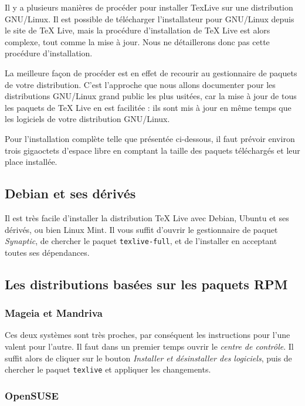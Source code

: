 Il y a plusieurs manières de procéder pour installer TexLive sur une distribution GNU/Linux. Il est possible de télécharger l'installateur pour GNU/Linux depuis le site de TeX Live, mais la procédure d'installation de TeX Live est alors complexe, tout comme la mise à jour. Nous ne détaillerons donc pas cette procédure d'installation.

La meilleure façon de procéder est en effet de recourir au gestionnaire de paquets de votre distribution. C'est l'approche que nous allons documenter pour les distributions GNU/Linux grand public les plus usitées, car la mise à jour de tous les paquets de TeX Live en est facilitée : ils sont mis à jour en même temps que les logiciels de votre distribution GNU/Linux.

Pour l'installation complète telle que présentée ci-dessous, il faut prévoir environ trois gigaoctets d'espace libre en comptant la taille des paquets téléchargés et leur place installée.

\subsection{Debian et ses dérivés}

Il est très facile d'installer la distribution TeX Live avec Debian, Ubuntu et ses dérivés, ou bien Linux Mint. Il vous suffit d'ouvrir le gestionnaire de paquet \emph{Synaptic}, de chercher le paquet  \verb|texlive-full|, et de l'installer en acceptant toutes ses dépendances.

\subsection{Les distributions basées sur les paquets RPM}

\subsubsection{Mageia et Mandriva}

Ces deux systèmes sont très proches, par conséquent les instructions pour l'une valent pour l'autre. Il faut dans un premier temps ouvrir le \emph{centre de contrôle}. Il suffit alors de cliquer sur le bouton \emph{Installer et désinstaller des logiciels}, puis de chercher le paquet \verb|texlive| et appliquer les changements. 

\subsubsection{OpenSUSE}

